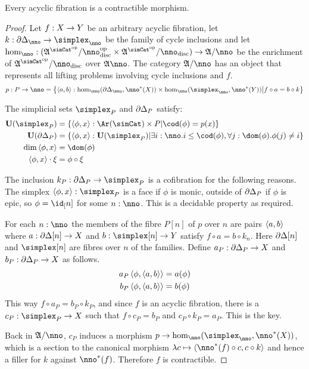 \documentclass[csh.tex]{subfiles}
\begin{document}
\begin{lemma} Every acyclic fibration is a contractible morphism. \label{acyclic means contractible} \end{lemma}

\begin{proof}
Let $f: X\to Y$ be an arbitrary acyclic fibration, let $k\of\cycle_\nno\to\simplex_\nno$ be the family of cycle inclusions and 
let $\hom_\nno\of(\ambient\s/\nno\disc\dual\times \ambient\s/\nno\disc)\to \ambient/\nno$ be the enrichment of $\ambient\s/\nno\disc$ over $\ambient\nno$.
The category $\ambient/\nno$ has an object that represents all lifting problems involving cycle inclusions and $f$.
\[ p\of P\to \nno = \set{\tuplet{a,b}\of \hom_\nno(\cycle_\nno,\nno\ri(X))\times \hom_\nno(\simplex_\nno,\nno\ri(Y)) \middle|f\circ a = b\circ k} \]

The simplicial sets $\simplex_P$ and $\partial\Delta_P$ satisfy:
\begin{align*}
\base(\simplex_P) &= \set{ \tuplet{\phi,x}\of\Ar(\simCat)\times P | \cod(\phi) = p(x) } \\
\base(\cycle_P) &= \set{\tuplet{\phi,x}\of\base(\simplex_P)\middle|\exists i\of\nno.i\leq \cod(\phi),\forall j\of \dom(\phi).\phi(j)\neq i} \\
\dim\tuplet{\phi,x} &= \dom(\phi) \\
\tuplet{\phi,x}\cdot \xi &=\phi\circ\xi
\end{align*}

The inclusion $k_P\of\cycle_P\to\simplex_P$ is a cofibration for the following reasons. The simplex $\tuplet{\phi,x}\of\simplex_P$ is a face if $\phi$ is monic, outside of $\partial\Delta_P$ if $\phi$ is epic, so $\phi = \id_[n]$ for some $n\of \nno$. This is a decidable property as required. 

For each $n\of\nno$ the members of the fibre $P[n]$ of $p$ over $n$ are pairs $\left\langle a,b \right\rangle$ where $a:\partial\Delta[n]\to X$ and $b\of \simplex[n]\to Y$ satisfy $f\circ a = b \circ k_n$. Here $\partial\Delta[n]$ and $\simplex[n]$ are fibres over $n$ of the families. Define $a_P: \partial\Delta_P\to X$ and $b_P: \partial\Delta_P\to X$ as follows.
\begin{align*}
a_P\left\langle \phi,\left\langle a,b \right\rangle \right\rangle &= a(\phi)\\
b_P\left\langle \phi,\left\langle a,b \right\rangle \right\rangle &= b(\phi)
\end{align*}
This way $f\circ a_P = b_P\circ k_P$, and since $f$ is an acyclic fibration, there is a $c_P\of \simplex_P\to X$ such that $f\circ c_P = b_P$ and $c_P\circ k_P = a_P$. This is the key.

Back in $\ambient/\nno$, $c_P$ induces a morphism $p\to\hom_\nno(\simplex_\nno,\nno\ri(X))$, which is a section to the canonical morphism $\function c\tuplet{\nno\ri(f)\circ c,c\circ k}$ and hence a filler for $k$ against $\nno\ri(f)$. Therefore $f$ is contractible.
\end{proof}
\end{document}

